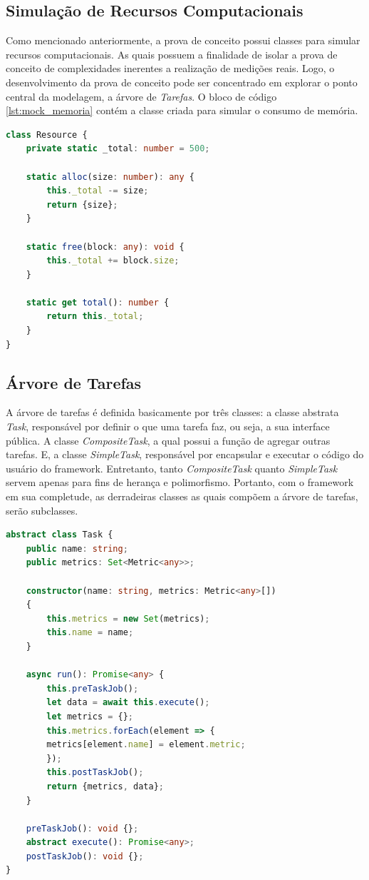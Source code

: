 \documentclass[12pt]{tcc}
\begin{document}
\subsection{Simulação de Recursos Computacionais}
Como mencionado anteriormente, a prova de conceito possui classes para simular recursos computacionais.
As quais possuem a finalidade de isolar a prova de conceito de complexidades inerentes a realização de medições reais.
Logo, o desenvolvimento da prova de conceito pode ser concentrado em explorar o ponto central da modelagem, a árvore de \emph{Tarefas}.
O bloco de código \ref{lst:mock_memoria} contém a classe criada para simular o consumo de memória.

\begin{lstlisting}[label={lst:mock_memoria}, caption={Implementação da classe responsável por simular recursos de memória para a prova de conceito do framework.}, language=TypeScript]
class Resource {
	private static _total: number = 500;

	static alloc(size: number): any {
		this._total -= size;
		return {size};
	}

	static free(block: any): void {
		this._total += block.size;
	}

	static get total(): number {
		return this._total;
	}
}
\end{lstlisting}


\subsection{Árvore de Tarefas}
\label{task-tree}

A árvore de tarefas é definida basicamente por três classes:
a classe abstrata \emph{Task}, responsável por definir o que uma tarefa faz, ou seja, a sua interface pública.
A classe \emph{CompositeTask}, a qual possui a função de agregar outras tarefas.
E, a classe \emph{SimpleTask}, responsável por encapsular e executar o código do usuário do framework.
Entretanto, tanto \emph{CompositeTask} quanto \emph{SimpleTask} servem apenas para fins de herança e polimorfismo.
Portanto, com o framework em sua completude, as derradeiras classes as quais compõem a árvore de tarefas, serão subclasses.

\begin{lstlisting}[label={lst:abstract_task}, caption={Classe abstrata responsável por definir o que todos os membros da árvore de tarefas precisam implementar.}, language=TypeScript]
abstract class Task {
	public name: string;
	public metrics: Set<Metric<any>>;

	constructor(name: string, metrics: Metric<any>[])
	{
		this.metrics = new Set(metrics);
		this.name = name;
	}

	async run(): Promise<any> {
		this.preTaskJob();
		let data = await this.execute();
		let metrics = {};
		this.metrics.forEach(element => {
		metrics[element.name] = element.metric;
		});
		this.postTaskJob();
		return {metrics, data};
	}

	preTaskJob(): void {};
	abstract execute(): Promise<any>;
	postTaskJob(): void {};
}
\end{lstlisting}
\end{document}
